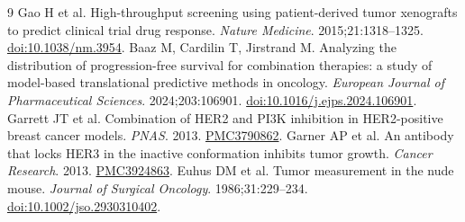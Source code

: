 \documentclass[10pt,a4paper]{article}
\begin{document}
\vspace{-3pt}\begin{thebibliography}{9}\small
{} Gao H et al. High-throughput screening using patient-derived tumor xenografts to predict clinical trial drug response. \emph{Nature Medicine}. 2015;21:1318--1325. \href{https://doi.org/10.1038/nm.3954}{doi:10.1038/nm.3954}.
 Baaz M, Cardilin T, Jirstrand M. Analyzing the distribution of progression-free survival for combination therapies: a study of model-based translational predictive methods in oncology. \emph{European Journal of Pharmaceutical Sciences}. 2024;203:106901. \href{https://doi.org/10.1016/j.ejps.2024.106901}{doi:10.1016/j.ejps.2024.106901}.
 Garrett JT et al. Combination of HER2 and PI3K inhibition in HER2-positive breast cancer models. \emph{PNAS}. 2013. \href{https://pmc.ncbi.nlm.nih.gov/articles/PMC3790862/}{PMC3790862}.
 Garner AP et al. An antibody that locks HER3 in the inactive conformation inhibits tumor growth. \emph{Cancer Research}. 2013. \href{https://pmc.ncbi.nlm.nih.gov/articles/PMC3924863/}{PMC3924863}.
 Euhus DM et al. Tumor measurement in the nude mouse. \emph{Journal of Surgical Oncology}. 1986;31:229--234. \href{https://doi.org/10.1002/jso.2930310402}{doi:10.1002/jso.2930310402}.
\end{thebibliography}
\end{document}
